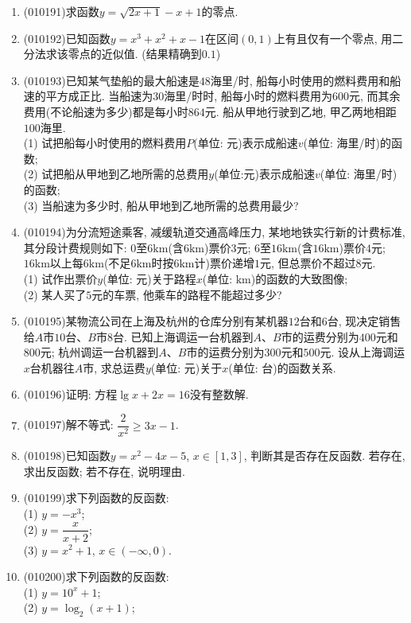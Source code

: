 \documentclass[10pt,a4paper]{article}
\begin{document}
\begin{enumerate}[1.]
\item {\tiny (010191)}求函数$y=\sqrt{2x+1}-x+1$的零点.
\item {\tiny (010192)}已知函数$y=x^3+x^2+x-1$在区间$(0, 1)$上有且仅有一个零点, 用二分法求该零点的近似值. (结果精确到$0.1$)
\item {\tiny (010193)}已知某气垫船的最大船速是$48$海里/时, 船每小时使用的燃料费用和船速的平方成正比. 当船速为$30$海里/时时, 船每小时的燃料费用为$600$元, 而其余费用(不论船速为多少)都是每小时$864$元. 船从甲地行驶到乙地, 甲乙两地相距$100$海里.\\
(1) 试把船每小时使用的燃料费用$P$(单位: 元)表示成船速$v$(单位: 海里/时)的函数;\\
(2) 试把船从甲地到乙地所需的总费用$y$(单位:元)表示成船速$v$(单位: 海里/时)的函数;\\
(3) 当船速为多少时, 船从甲地到乙地所需的总费用最少?
\item {\tiny (010194)}为分流短途乘客, 减缓轨道交通高峰压力, 某地地铁实行新的计费标准, 其分段计费规则如下: $0$至$6\text{km}$(含$6\text{km}$)票价$3$元; $6$至$16\text{km}$(含$16\text{km}$)票价$4$元; $16\text{km}$以上每$6\text{km}$(不足$6\text{km}$时按$6\text{km}$计)票价递增$1$元, 但总票价不超过$8$元.\\
(1) 试作出票价$y$(单位: 元)关于路程$x$(单位: $\text{km}$)的函数的大致图像;\\
(2) 某人买了$5$元的车票, 他乘车的路程不能超过多少?
\item {\tiny (010195)}某物流公司在上海及杭州的仓库分别有某机器$12$台和$6$台, 现决定销售给$A$市$10$台、$B$市$8$台. 已知上海调运一台机器到$A$、$B$市的运费分别为$400$元和$800$元; 杭州调运一台机器到$A$、$B$市的运费分别为$300$元和$500$元. 设从上海调运$x$台机器往$A$市, 求总运费$y$(单位: 元)关于$x$(单位: 台)的函数关系.
\item {\tiny (010196)}证明: 方程$\lg x+2x=16$没有整数解.
\item {\tiny (010197)}解不等式: $\dfrac 2{x^2}\ge 3x-1$.
\item {\tiny (010198)}已知函数$y=x^2-4x-5$, $x\in [1, 3]$, 判断其是否存在反函数. 若存在, 求出反函数; 若不存在, 说明理由.
\item {\tiny (010199)}求下列函数的反函数:\\
(1) $y=-x^3$;\\
(2) $y=\dfrac x{x+2}$;\\
(3) $y=x^2+1$, $x\in (-\infty, 0)$.
\item {\tiny (010200)}求下列函数的反函数:\\
(1) $y=10^x+1$;\\
(2) $y=\log_2(x+1)$;\\

\end{enumerate}
\end{document}
